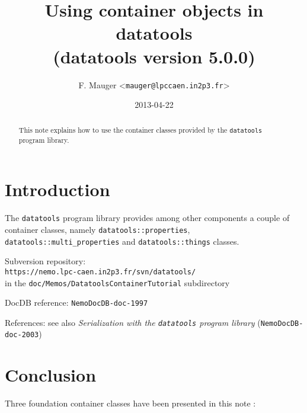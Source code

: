 \documentclass[a4paper,12pt]{article}
\title{Using container objects in datatools\\%
{\small{(datatools version 5.0.0)}}}
\author{F. Mauger <\texttt{mauger@lpccaen.in2p3.fr}>}
\date{2013-04-22}
\newcommand{\pn}{\par\noindent}
\begin{document}
\maketitle

\begin{abstract}
This note  explains how to use  the container classes  provided by the
\texttt{datatools} program library.
\end{abstract}

\tableofcontents

\section{Introduction}

\pn  The  \texttt{datatools}  program library  provides  among  other
components     a    couple     of     container    classes,     namely
\texttt{datatools::properties},   \texttt{datatools::multi\_properties}
and \texttt{datatools::things} classes.

\vskip 5mm
\pn
Subversion repository:\\
\texttt{https://nemo.lpc-caen.in2p3.fr/svn/datatools/} \\
in the \texttt{doc/Memos/DatatoolsContainerTutorial} subdirectory
\pn
DocDB reference: \texttt{NemoDocDB-doc-1997}
\pn
References: see also \textit{Serialization with the \texttt{datatools} program library}
(\texttt{NemoDocDB-doc-2003})

\clearpage


\clearpage


\clearpage


\clearpage

\section{Conclusion}

\pn  Three foundation container  classes have  been presented  in this
note :
\end{document}
